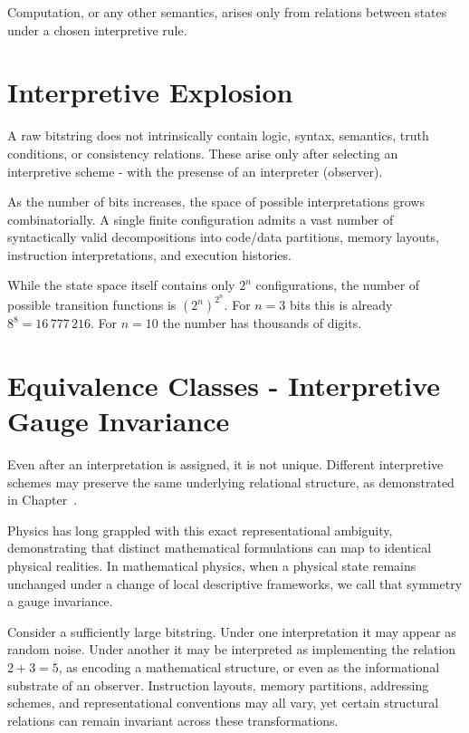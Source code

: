 Computation, or any other semantics, arises only from relations between states under a chosen interpretive rule.


\section{Interpretive Explosion}

A raw bitstring does not intrinsically contain logic, syntax, semantics, truth conditions, or consistency relations.
These arise only after selecting an interpretive scheme - with the presense of an interpreter (observer).

As the number of bits increases, the space of possible interpretations grows combinatorially.
A single finite configuration admits a vast number of syntactically valid decompositions into code/data partitions,
memory layouts, instruction interpretations, and execution histories.

While the state space itself contains only $2^n$ configurations, the number of possible transition functions is $(2^n)^{2^n}$.
For $n=3$ bits this is already $8^8 = 16\,777\,216$.
For $n=10$ the number has thousands of digits.



\section{Equivalence Classes - Interpretive Gauge Invariance}

Even after an interpretation is assigned, it is not unique.
Different interpretive schemes may preserve the same underlying relational structure, as demonstrated
in Chapter~.

Physics has long grappled with this exact representational ambiguity, demonstrating that distinct mathematical formulations can map to identical physical realities.
In mathematical physics, when a physical state remains unchanged under a change of local descriptive frameworks, we call that symmetry a gauge invariance.

Consider a sufficiently large bitstring.
Under one interpretation it may appear as random noise.
Under another it may be interpreted as implementing the relation $2 + 3 = 5$, as encoding a mathematical structure, or even as the informational substrate of an observer.
Instruction layouts, memory partitions, addressing schemes, and representational conventions may all vary, yet certain structural relations can remain invariant across these transformations.

